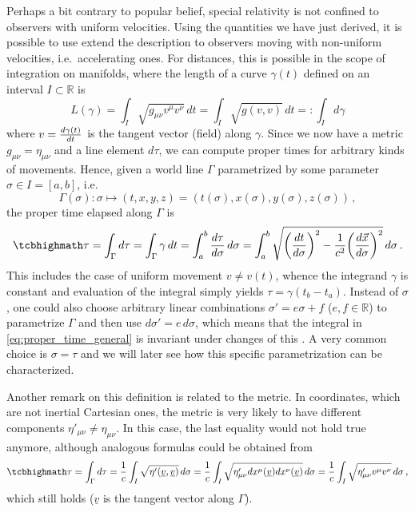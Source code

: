 Perhaps a bit contrary to popular belief, special relativity is not confined to observers with uniform velocities. Using the quantities we have just derived, it is possible to use extend the description to observers moving with non-uniform velocities, i.e.~accelerating ones. For distances, this is possible in the scope of integration on manifolds, where the length of a curve $\gamma(t)$ defined on an interval $I \subset \mathbb{R}$ is
\begin{equation*}
L(\gamma) = \int_I \sqrt{g_{\mu \nu} v^\mu v^\nu} \, dt = \int_I \sqrt{g(v, v)} \, dt =: \int_I d\gamma
\end{equation*}
where $v = \dv{\gamma(t)}{t}$ is the tangent vector (field) along $\gamma$. Since we now have a metric $g_{\mu \nu} = \eta_{\mu \nu}$ and a line element $d\tau$, we can compute proper times for arbitrary kinds of movements. Hence, given a world line $\Gamma$ parametrized by some parameter $\sigma \in I = [a, b]$, i.e.~
\begin{equation*}
\Gamma(\sigma): \sigma \mapsto (t, x, y, z) = (t(\sigma), x(\sigma), y(\sigma), z(\sigma)) \, ,
\end{equation*}
the proper time elapsed along $\Gamma$ is
\begin{equation}\label{eq:proper_time_general}
\eqbox{
\tau = \int_\Gamma d\tau = \int_\Gamma \gamma \, dt = \int_a^b \dv{\tau}{\sigma} \, d\sigma = \int_a^b \sqrt{\qty(\dv{t}{\sigma})^2 - \frac{1}{c^2} \qty(\dv{\vec{x}}{\sigma})^2} \, d\sigma
} \, .
\end{equation}
This includes the case of uniform movement $v \neq v(t)$, whence the integrand $\gamma$ is constant and evaluation of the integral simply yields $\tau = \gamma (t_b - t_a)$. Instead of $\sigma$, one could also choose arbitrary linear combinations $\sigma' = e \sigma + f$ ($e, f \in \mathbb{R}$) to parametrize $\Gamma$ and then use $d\sigma' = e \, d\sigma$, which means that the integral in \eqref{eq:proper_time_general} is invariant under changes of this . A very common choice is $\sigma = \tau$ and we will later see how this specific parametrization can be characterized.

Another remark on this definition is related to the metric. In coordinates, which are not inertial Cartesian ones, the metric is very likely to have different components $\eta'_{\mu \nu} \neq \eta_{\mu \nu}$. In this case, the last equality would not hold true anymore, although analogous formulas could be obtained from
\begin{equation}\label{eq:proper_time_non_cartesian}
\eqbox{
\tau = \int_\Gamma d\tau = \frac{1}{c} \int_I \sqrt{\eta'(\underline{v}, \underline{v})} \, d\sigma = \frac{1}{c} \int_I \sqrt{\eta'_{\mu \nu} dx^\mu(\underline{v}) dx^\nu(\underline{v})} \, d\sigma = \frac{1}{c} \int_I \sqrt{\eta'_{\mu \nu} v^\mu v^\nu} \, d\sigma
} \, ,
\end{equation}
which still holds ($\underline{v}$ is the tangent vector along $\Gamma$).\\



